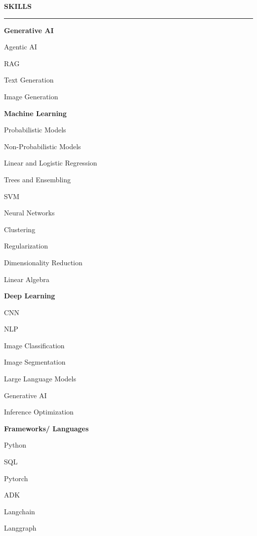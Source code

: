 \documentclass[10pt, a4paper]{article}
\newcommand{\sidebarsection}[1]{%
  \vspace{1.2\baselineskip}%
  {\color{white}\bfseries\sffamily\MakeUppercase{#1}}\par%
  \vspace{0.6ex}%
  {\color{white!60}\hrule height 0.6pt}\par%
  \vspace{0.5\baselineskip}%
}
\newcommand{\skillcat}[1]{%
    \vspace{0.8\baselineskip}%
    {\bfseries\sffamily #1}\par\vspace{1.0ex}%
}
\begin{document}
\begin{paracol}{2}
\sidebarsection{Skills}
\skillcat{Generative AI}
Agentic AI\par\vspace{0.4ex}
RAG\par\vspace{0.4ex}
Text Generation\par\vspace{0.4ex}
Image Generation\par\vspace{0.4ex}

\skillcat{Machine Learning}
Probabilistic Models\par\vspace{0.4ex}
Non-Probabilistic Models\par\vspace{0.4ex}
Linear and Logistic Regression\par\vspace{0.4ex}
Trees and Ensembling\par\vspace{0.4ex}
SVM\par\vspace{0.4ex}
Neural Networks\par\vspace{0.4ex}
Clustering\par\vspace{0.4ex}
Regularization\par\vspace{0.4ex}
Dimensionality Reduction\par\vspace{0.4ex}
Linear Algebra\par

\skillcat{Deep Learning}
CNN\par\vspace{0.4ex}
NLP\par\vspace{0.4ex}
Image Classification\par\vspace{0.4ex}
Image Segmentation\par\vspace{0.4ex}
Large Language Models\par\vspace{0.4ex}
Generative AI\par\vspace{0.4ex}
Inference Optimization\par

\skillcat{Frameworks/ Languages}
Python\par\vspace{0.4ex}
SQL\par\vspace{0.4ex}
Pytorch\par\vspace{0.4ex}
ADK\par\vspace{0.4ex}
Langchain\par\vspace{0.4ex}
Langgraph\par\vspace{0.4ex}
    


\end{paracol}
\end{document}
